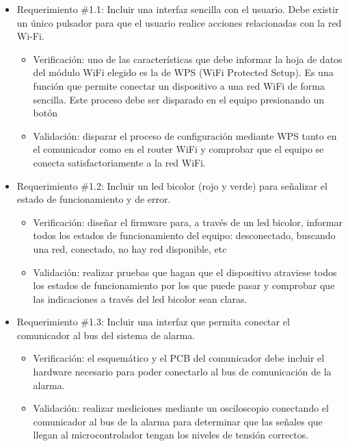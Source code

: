 \documentclass[
11pt, %
codirector, %
]{charter}
\begin{document}
\begin{itemize} 
	\item Requerimiento \#1.1: Incluir una interfaz sencilla con el usuario. Debe existir un único pulsador para que el usuario realice acciones relacionadas con la red Wi-Fi.
	\begin{itemize}
		\item Verificación: uno de las características que debe informar la hoja de datos del
módulo WiFi elegido es la de WPS (WiFi Protected Setup). Es una función que permite conectar un dispositivo a una red WiFi de forma sencilla. Este proceso debe ser disparado en el equipo presionando un botón
		\item Validación: disparar el proceso de configuración mediante WPS tanto en el
comunicador como en el router WiFi y comprobar que el equipo se conecta satisfactoriamente a la red WiFi.

	\end{itemize}
		
	\item Requerimiento \#1.2: Incluir un led bicolor (rojo y verde) para señalizar el estado de funcionamiento y de error.
	\begin{itemize}
		\item Verificación: diseñar el firmware para, a través de un led bicolor, informar todos los estados de funcionamiento del equipo: desconectado, buscando una red, conectado, no hay red disponible, etc
		\item Validación: realizar pruebas que hagan que el dispositivo atraviese todos los
estados de funcionamiento por los que puede pasar y comprobar que las indicaciones a través del led bicolor sean claras.
	\end{itemize}
			
	\item Requerimiento \#1.3: Incluir una interfaz que permita conectar el comunicador al bus del sistema de alarma.
	\begin{itemize}
		\item Verificación: el esquemático y el PCB del comunicador debe incluir el hardware necesario para poder conectarlo al bus de comunicación de la alarma. 
		\item Validación: realizar mediciones mediante un osciloscopio conectando el comunicador al bus de la alarma para determinar que las señales que llegan al microcontrolador tengan los niveles de tensión correctos.
	\end{itemize}
			

\end{itemize}
\end{document}
